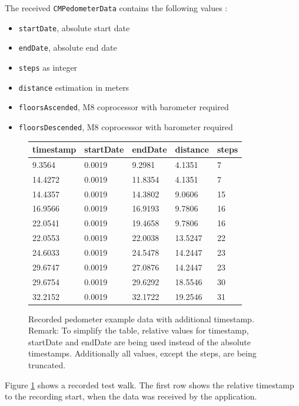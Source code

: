 The received \texttt{CMPedometerData} contains the following values \cite{ios_cm}:
\begin{itemize}
  \item \texttt{startDate}, absolute start date
  \item \texttt{endDate}, absolute end date
  \item \texttt{steps} as integer
  \item \texttt{distance} estimation in meters
  \item \texttt{floorsAscended}, M8 coprocessor with barometer required
  \item \texttt{floorsDescended}, M8 coprocessor with barometer required
\end{itemize}

\begin{center}
\begin{figure}
\begin{tabular}{*{5}{l}}
timestamp & startDate & endDate & distance & steps\\
\hline
9.3564 & 0.0019 & 9.2981 & 4.1351 & 7\\
14.4272 & 0.0019 & 11.8354 & 4.1351 & 7\\
14.4357 & 0.0019 & 14.3802 & 9.0606 & 15\\
16.9566 & 0.0019 & 16.9193 & 9.7806 & 16\\
22.0541 & 0.0019 & 19.4658 & 9.7806 & 16\\
22.0553 & 0.0019 & 22.0038 & 13.5247 & 22\\
24.6033 & 0.0019 & 24.5478 & 14.2447 & 23\\
29.6747 & 0.0019 & 27.0876 & 14.2447 & 23\\
29.6754 & 0.0019 & 29.6292 & 18.5546 & 30\\
32.2152 & 0.0019 & 32.1722 & 19.2546 & 31\\
\end{tabular}
\caption{Recorded pedometer example data with additional timestamp.
Remark: To simplify the table, relative values for timestamp, startDate and endDate are being used instead of the absolute timestamps.
Additionally all values, except the steps, are being truncated.}
\label{fig:pedometerExampleData}
\end{figure}
\end{center}

Figure \ref{fig:pedometerExampleData} shows a recorded test walk.
The first row shows the relative timestamp to the recording start, when the data was received by the application.

